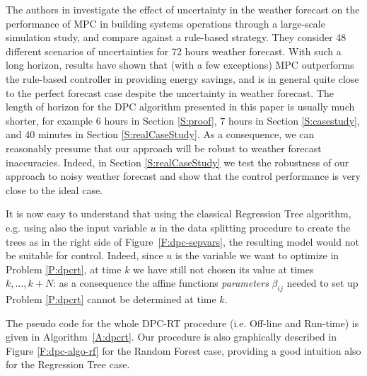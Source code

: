 \textcolor[rgb]{0,0,1}{\begin{remark}
The authors in \cite{Petersen2014AE} investigate the effect of uncertainty in the weather forecast on the performance of MPC in building systems operations through a large-scale simulation study, and compare against a rule-based strategy. They consider 48 different scenarios of uncertainties for 72 hours weather forecast. With such a long horizon, results have shown that (with a few exceptions) MPC outperforms the rule-based controller in providing energy savings, and is in general quite close to the perfect forecast case despite the uncertainty in weather forecast. The length of horizon for the DPC algorithm presented in this paper is usually much shorter, for example $6$ hours in Section \ref{S:proof}, $7$ hours in Section \ref{S:casestudy}, and $40$ minutes in Section \ref{S:realCaseStudy}. As a consequence, we can reasonably presume that our approach will be robust to weather forecast inaccuracies. Indeed, in Section \ref{S:realCaseStudy} we test the robustness of our approach to noisy weather forecast and show that the control performance is very close to the ideal case.
\end{remark}}

\textcolor[rgb]{0,0,1}{\begin{remark}
It is now easy to understand that using the classical Regression Tree algorithm, e.g. using also the input variable $u$ in the data splitting procedure to create the trees as in the right side of Figure~\ref{F:dpc-sepvars}, the resulting model would not be suitable for control. Indeed, since $u$ is the variable we want to optimize in Problem \ref{P:dpcrt}, at time $k$ we have still not chosen its value at times $k, \ldots, k+N$: as a consequence the affine functions \emph{parameters }$\beta_{ij}$ needed to set up Problem \ref{P:dpcrt} cannot be determined at time $k$.
\end{remark}}

\textcolor[rgb]{0,0,1}{The pseudo code for the whole DPC-RT procedure (i.e. Off-line and Run-time) is given in Algorithm~\ref{A:dpcrt}. Our procedure is also graphically described in Figure \ref{F:dpc-algo-rf} for the Random Forest case, providing a good intuition also for the Regression Tree case.}

